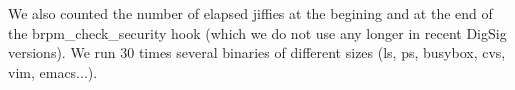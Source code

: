 \documentclass{article}
\begin{document}



We also counted the number of elapsed jiffies at the begining and at the
end of the brpm\_check\_security hook (which we do not use any longer
in recent DigSig versions). We run 30 times several binaries of different sizes
(ls, ps, busybox, cvs, vim, emacs...).

\end{document}
